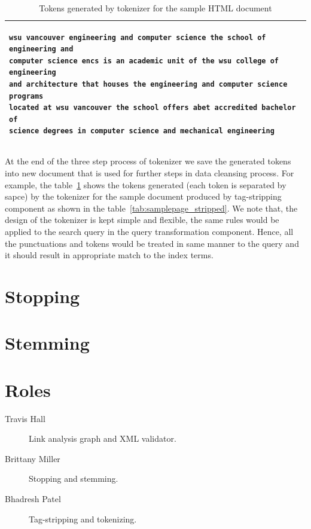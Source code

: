 \documentclass[letterpaper,11pt,twoside]{article}
\begin{document}
\begin{table}[htb]
\centering
\begin{tabular}{|p{\textwidth}|}
\hline
\begin{verbatim}
wsu vancouver engineering and computer science the school of engineering and
computer science encs is an academic unit of the wsu college of engineering
and architecture that houses the engineering and computer science programs
located at wsu vancouver the school offers abet accredited bachelor of
science degrees in computer science and mechanical engineering
\end{verbatim}\\
\hline
\end{tabular}
\caption{Tokens generated by tokenizer for the sample HTML document}
\label{tab:samplepage_tokenized}
\end{table}

At the end of the three step process of tokenizer we save the generated tokens into new document that is used for further steps in data cleansing process. For example, the table~\ref{tab:samplepage_tokenized} shows the tokens generated (each token is separated by sapce) by the tokenizer for the sample document produced by tag-stripping component as shown in the table~\ref{tab:samplepage_stripped}. We note that, the design of the tokenizer is kept simple and flexible, the same rules would be applied to the search query in the query transformation component. Hence, all the punctuations and tokens would be treated in same manner to the query and it should result in appropriate match to the index terms. 

\section{Stopping}

\section{Stemming}


\section{Roles}
\begin{description}
 \item[Travis Hall] Link analysis graph and XML validator.
 \item[Brittany Miller] Stopping and stemming.
 \item[Bhadresh Patel] Tag-stripping and tokenizing.
\end{description}
\end{document}
